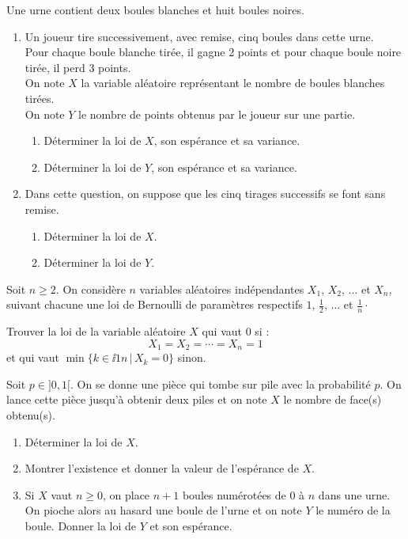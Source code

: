 \documentclass[a4paper,twoside,french,11pt]{VcCours}
\begin{document}
\begin{Exercice}{} Une urne contient deux boules blanches et huit boules noires.
\begin{enumerate}
\item
Un joueur tire successivement, avec remise,  cinq boules dans cette urne.\\
Pour chaque boule blanche tirée, il gagne 2 points et pour chaque boule noire tirée, il perd 3 points.\\
On note $X$ la variable aléatoire représentant le nombre de boules blanches tirées.\\
On note $Y$ le nombre de points obtenus par le joueur sur une partie.
\begin{enumerate}
\item
Déterminer la loi de $X$, son espérance et sa variance.
\item
Déterminer la loi de $Y$, son espérance et sa variance.
\end{enumerate}
\item
Dans cette question, on suppose que les cinq tirages successifs se font sans remise.
\begin{enumerate}
\item 
Déterminer la loi de $X$.
\item
Déterminer la loi de $Y$.
\end{enumerate}
\end{enumerate}
\end{Exercice}




\begin{Exercice}{} Soit $n \geq 2$. On considère $n$ variables aléatoires indépendantes $X_1$, $X_2$, $\ldots$ et $X_n$, suivant chacune une loi de Bernoulli de paramètres respectifs $1$, $\tfrac{1}{2}$, $\ldots$ et $\tfrac{1}{n}\cdot$

Trouver la loi de la variable aléatoire $X$ qui vaut $0$ si :
$$ X_1= X_2= \cdots = X_n = 1$$
et qui vaut $\min \lbrace k \in \ii{1}{n} \, \vert \, X_k =0 \rbrace$ sinon.
\end{Exercice} 

\begin{Exercice}{} Soit $p \in ]0,1[$. On se donne une pièce qui tombe sur pile avec la probabilité $p$. On lance cette pièce jusqu'à obtenir deux piles et on note $X$ le nombre de face(s) obtenu(s).

\begin{enumerate}
\item Déterminer la loi de $X$.
\item Montrer l'existence et donner la valeur de l'espérance de $X$.
\item Si $X$ vaut $n \geq 0$, on place $n+1$ boules numérotées de $0$ à $n$ dans une urne. On pioche alors au hasard une boule de l'urne et on note $Y$ le numéro de la boule. Donner la loi de $Y$ et son espérance.
\end{enumerate}   
\end{Exercice}
\end{document}
